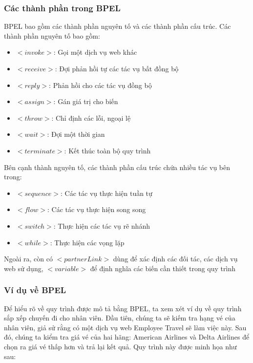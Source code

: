 \subsubsection{Các thành phần trong BPEL}
BPEL bao gồm các thành phần nguyên tố và các thành phần cấu trúc. Các thành phần nguyên tố bao gồm:
\begin{itemize}
	\item $<invoke>$: Gọi một dịch vụ web khác
	\item $<receive>$: Đợi phản hồi tự các tác vụ bất đồng bộ
	\item $<reply>$: Phản hồi cho các tác vụ đồng bộ
	\item $<assign>$: Gán giá trị cho biến
	\item $<throw>$: Chỉ định các lỗi, ngoại lệ
	\item $<wait>$: Đợi một thời gian
	\item $<terminate>$: Kết thúc toàn bộ quy trình
\end{itemize}

Bên cạnh thành nguyên tố, các thành phần cấu trúc chứa nhiều tác vụ bên trong:
\begin{itemize}
	\item $<sequence>$: Các tác vụ thực hiện tuần tự
	\item $<flow>$: Các tác vụ thực hiện song song
	\item $<switch>$: Thực hiện các tác vụ rẽ nhánh
	\item $<while>$: Thực hiện các vọng lặp
\end{itemize}

Ngoài ra, còn có $<partnerLink>$ dùng để xác định các đối tác, các dịch vụ web sử dụng, $<variable>$ để định nghĩa các biến cần thiết trong quy trình


\subsubsection{Ví dụ về BPEL}

\hspace*{0.5cm} Để hiểu rõ về quy trình được mô tả bằng BPEL, ta xem xét ví dụ về quy trình sắp xếp chuyến đi cho nhân viên. Đầu tiên, chúng ta sẽ kiếm tra hạng vé của nhân viên, giả sử rằng có một dịch vụ web Employee Travel sẽ làm việc này. Sau đó, chúng ta kiểm tra giá vé của hai hãng: American Airlines và Delta Airlines để chọn ra giá vé thấp hơn và trả lại kết quả. Quy trình này được minh họa như sau:

